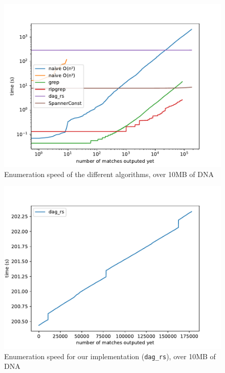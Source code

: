 \documentclass[11px]{article}
\theoremstyle{definition}
\newcommand{\pierre}[1]{\textcolor{magenta}{[\textbf{Pierre:} #1]}}
\begin{document}
      \begin{figure}%
        \caption{
          Enumeration speed of the different algorithms, over 10MB of DNA
        }
        \label{fig:bench_enum_only}
        \center\includegraphics[width=5in]{figures/bench}
      \end{figure}

      \begin{figure}%
        \label{fig:bench}
        \caption{
          Enumeration speed for our implementation (\texttt{dag\_rs}), over
          10MB of DNA
        }
        \center\includegraphics[width=5in]{figures/bench_enum_only}
      \end{figure}
\end{document}
